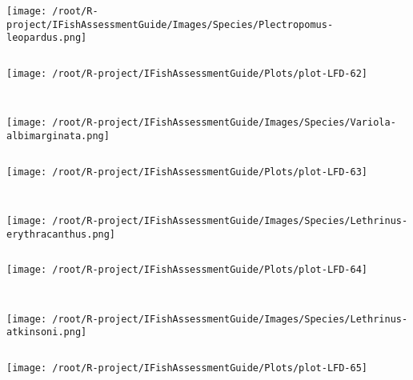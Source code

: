 \begin{knitrout}
\begin{kframe}
\begin{verbatim}
\end{verbatim}
\end{kframe}
\texttt{[image: /root/R-project/IFishAssessmentGuide/Images/Species/Plectropomus-leopardus.png]}
\begin{kframe}\begin{verbatim}
\end{verbatim}
\end{kframe}
\texttt{[image: /root/R-project/IFishAssessmentGuide/Plots/plot-LFD-62]} 
\begin{kframe}\begin{verbatim}
 
\end{verbatim}
\end{kframe}
\texttt{[image: /root/R-project/IFishAssessmentGuide/Images/Species/Variola-albimarginata.png]}
\begin{kframe}\begin{verbatim}
\end{verbatim}
\end{kframe}
\texttt{[image: /root/R-project/IFishAssessmentGuide/Plots/plot-LFD-63]} 
\begin{kframe}\begin{verbatim}
 
\end{verbatim}
\end{kframe}
\texttt{[image: /root/R-project/IFishAssessmentGuide/Images/Species/Lethrinus-erythracanthus.png]}
\begin{kframe}\begin{verbatim}
\end{verbatim}
\end{kframe}
\texttt{[image: /root/R-project/IFishAssessmentGuide/Plots/plot-LFD-64]} 
\begin{kframe}\begin{verbatim}
 
\end{verbatim}
\end{kframe}
\texttt{[image: /root/R-project/IFishAssessmentGuide/Images/Species/Lethrinus-atkinsoni.png]}
\begin{kframe}\begin{verbatim}
\end{verbatim}
\end{kframe}
\texttt{[image: /root/R-project/IFishAssessmentGuide/Plots/plot-LFD-65]} 
\begin{kframe}\begin{verbatim}
 

\end{verbatim}
\end{kframe}
\end{knitrout}
